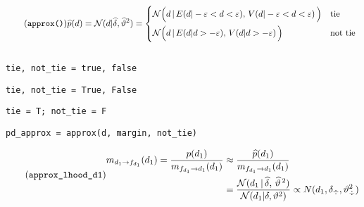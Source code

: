 \documentclass[article]{jss}
\newif\ifen
\newif\ifes
\newcommand{\en}[1]{\ifen#1\fi}
\newcommand{\es}[1]{\ifes#1\fi}
\newcommand{\N}{\mathcal{N}}
\begin{document}
%
\en{Then, the Gaussian that best approximates $p(d_1)$ in a winning case is}
\es{Luego, la gaussiana que mejor aproxima a $p(d_1)$ en un caso ganador es}
%
\begin{equation}\label{eq:p*_d} \tag{\texttt{approx()}}
 \widehat{p}(d) = \N(d | \widehat{\delta}, \widehat{\vartheta}^2) =
 \begin{cases*}
 \N\Big(d \,  | \, E(d | -\varepsilon < d < \varepsilon ) , \,  V(d | -\varepsilon < d < \varepsilon ) \, \Big) & \text{tie} \\
\N\Big(d \,  | \, E(d | d > -\varepsilon ) , \,  V(d | d > -\varepsilon ) \, \Big) & \text{not tie}
  \end{cases*}
\end{equation}
%
\begin{lstlisting}[backgroundcolor=\color
{white},label=lst:pd_approx, caption=\relax, belowskip=-1.0 \baselineskip, aboveskip=-0 \baselineskip]
\end{lstlisting}
\begin{paracol}{3}
\begin{lstlisting}[backgroundcolor=\color{julia},belowskip=-0.77 \baselineskip]
tie, not_tie = true, false
\end{lstlisting}
\switchcolumn
\begin{lstlisting}[backgroundcolor=\color{python},belowskip=-0.77 \baselineskip]
tie, not_tie = True, False
\end{lstlisting}
\switchcolumn
\begin{lstlisting}[backgroundcolor=\color{r},belowskip=-0.77 \baselineskip]
tie = T; not_tie = F 
\end{lstlisting}
\end{paracol}
\begin{lstlisting}[backgroundcolor=\color{all}]
pd_approx = approx(d, margin, not_tie)
\end{lstlisting}
%
\en{Given $\widehat{p}(d_1)$, we can compute the approximate ascending message.}
\es{Dada $\widehat{p}(d_1)$, podemos calcular el mensaje ascendentes aproximado.}
%
\begin{equation}\label{eq:m^_d_fd} \tag{\texttt{approx\_lhood\_d1}}
\begin{split}
 m_{d_1 \rightarrow f_{d_1}}(d_1)   = \frac{p(d_1)}{m_{f_{d_1} \rightarrow d_1}(d_1)} 
 & \approx \frac{\widehat{p}(d_1)}{m_{f_{d_1} \rightarrow d_1}(d_1)}  \\
& = \frac{\N(d_1 \,  | \,\widehat{\delta} , \, \widehat{\vartheta}^{\,2} )}{\N(d_1 | \delta, \vartheta^2)} 
\propto N(d_1,\delta_{\div},\vartheta_{\div}^2 )
\end{split}
\end{equation}
\end{document}
